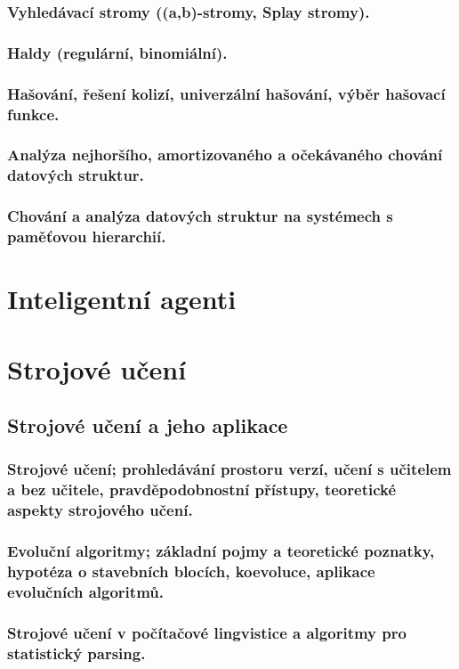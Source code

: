 \documentclass[11pt]{report} %
\begin{document}
\section{Vyhledávací stromy ((a,b)-stromy, Splay stromy).}
\section{Haldy (regulární, binomiální).}
\section{Hašování, řešení kolizí, univerzální hašování, výběr hašovací funkce.}
\section{Analýza nejhoršího, amortizovaného a očekávaného chování datových struktur.}
\section{Chování a analýza datových struktur na systémech s paměťovou hierarchií.}



\part{Inteligentní agenti}



\part{Strojové učení}
\chapter{Strojové učení a jeho aplikace}
\section{Strojové učení; prohledávání prostoru verzí, učení s učitelem a bez učitele, pravděpodobnostní přístupy, teoretické aspekty strojového učení.}
\section{Evoluční algoritmy; základní pojmy a teoretické poznatky, hypotéza o stavebních blocích, koevoluce, aplikace evolučních algoritmů.}
\section{Strojové učení v počítačové lingvistice a algoritmy pro statistický parsing.}
\end{document}
